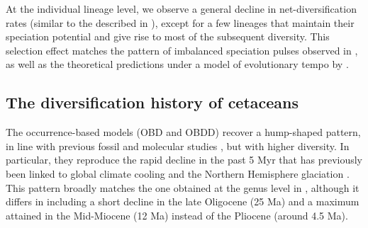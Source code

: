 \documentclass[oupdraft]{sysbio}
\newcommand{\revised}[1]{{\color{blue} #1}}
\begin{document}
At the individual lineage level, we observe a general decline in net-diversification rates (similar to the  described in \citet{quintero_loss_2025}), except for a few lineages that maintain their speciation potential and give rise to most of the subsequent diversity. This selection effect matches the pattern of imbalanced speciation pulses observed in \citet{quintero_imbalanced_2024}, as well as the theoretical predictions under a model of evolutionary tempo by \citet{budd_evolutionary_2025}.

\subsection{\revised{The diversification history of cetaceans}}

The occurrence-based models (OBD and OBDD) recover a hump-shaped pattern, in line with previous fossil and molecular studies \citep{morlon_reconciling_2011}, but with higher diversity. In particular, they reproduce the rapid decline in the past 5 Myr that has previously been linked to global climate cooling and the Northern Hemisphere glaciation \citep{andreoletti_occurrence_2022}. This pattern broadly matches the one obtained at the genus level in \citet{andreoletti_occurrence_2022}, although it differs in including a short decline in the late Oligocene (25 Ma) and a maximum attained in the Mid-Miocene (12 Ma) instead of the Pliocene (around 4.5 Ma).
\end{document}
